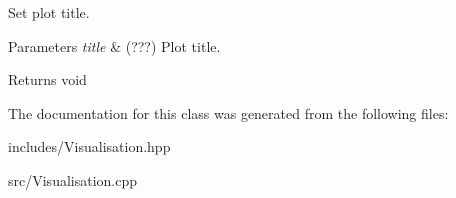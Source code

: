 Set plot title. 


\begin{DoxyParams}{Parameters}
{\em title} & (???) Plot title. \\
\hline
\end{DoxyParams}
\begin{DoxyReturn}{Returns}
void 
\end{DoxyReturn}


The documentation for this class was generated from the following files\+:\begin{DoxyCompactItemize}
\item 
includes/Visualisation.\+hpp\item 
src/Visualisation.\+cpp\end{DoxyCompactItemize}
